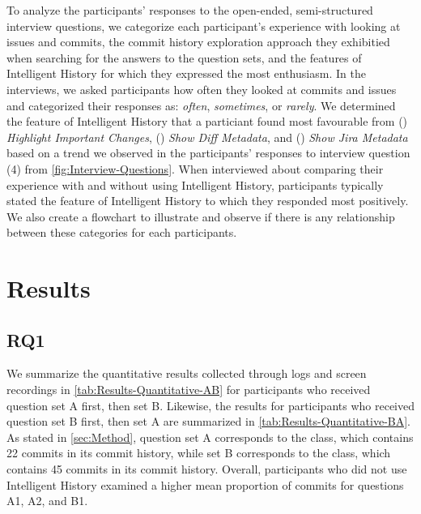To analyze the participants' responses to the open-ended, semi-structured interview questions, 
we categorize each participant's experience with looking at issues and commits,
the commit history exploration approach they exhibitied when searching for the answers to the question sets, 
and the features of Intelligent History for which they expressed the most enthusiasm.
In the interviews, we asked participants how often they looked at commits and issues 
and categorized their responses as: 
\textit{often}, \textit{sometimes}, or \textit{rarely}.
We determined the feature of Intelligent History that a particiant found most favourable from
() \textit{Highlight Important Changes}, 
() \textit{Show Diff Metadata}, and
() \textit{Show Jira Metadata}
based on a trend we observed in the participants' responses to interview question (4) from \autoref{fig:Interview-Questions}.
When interviewed about comparing their experience with and without using Intelligent History,
participants typically stated the feature of Intelligent History to which they responded most positively.
We also create a flowchart to illustrate and observe if there is any 
relationship between these categories for each participants.

\section{Results}
\label{sec:Results}

\subsection{RQ1}
\label{subsec:RQ1}


We summarize the quantitative results collected through logs and screen recordings in \autoref{tab:Results-Quantitative-AB} 
for participants who received question set A first, then set B.
Likewise, the results for participants who received question set B first, then set A are summarized in \autoref{tab:Results-Quantitative-BA}.
As stated in \autoref{sec:Method}, question set A corresponds to the  class, which contains 22 commits in its commit history, 
while set B corresponds to the  class, which contains 45 commits in its commit history.
Overall, participants who did not use Intelligent History examined a higher mean proportion of commits for questions A1, A2, and B1.

